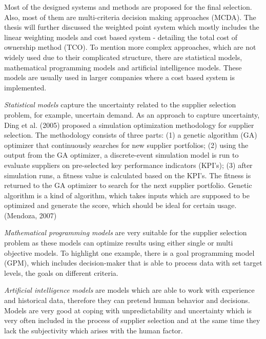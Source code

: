 \documentclass[oneside,12pt]{article}%
\begin{document}
Most of the designed systems and methods are proposed for the final selection. Also, most of them are multi-criteria decision making approaches (MCDA). The thesis will further discussed the weighted point system which mostly includes the linear weighting models and cost based system - detailing the total cost of ownership method (TCO). To mention more complex approaches, which are not widely used due to their complicated structure, there are statistical models, mathematical programming models and artificial intelligence models. These models are usually used in larger companies where a cost based system is implemented.\par
\emph{Statistical models} capture the uncertainty related to the supplier selection problem, for example, uncertain demand. As an approach to capture uncertainty, Ding et al. (2005) proposed a simulation optimization methodology for supplier selection. The methodology consists of three parts: (1) a genetic algorithm (GA) optimizer that continuously searches for new supplier portfolios; (2) using the output from the GA optimizer, a discrete-event simulation model is run to evaluate suppliers on pre-selected key performance indicators (KPI’s); (3) after simulation runs, a fitness value is calculated based on the KPI’s. The fitness is returned to the GA optimizer to search for the next supplier portfolio. Genetic algorithm is a kind of algorithm, which takes inputs which are supposed to be optimized and generate the score, which should be ideal for certain usage. (Mendoza, 2007)\par
\emph{Mathematical programming models} are very suitable for the supplier selection problem as these models can optimize results using either single or multi objective models. To highlight one example, there is a goal programming model (GPM), which includes decision-maker that is able to process data with set target levels, the goals on different criteria. \par
\emph{Artificial intelligence models} are models which are able to work with experience and historical data, therefore they can pretend human behavior and decisions. Models are very good at coping with unpredictability and uncertainty which is very often included in the process of supplier selection and at the same time they lack the subjectivity which arises with the human factor.


\end{document}
